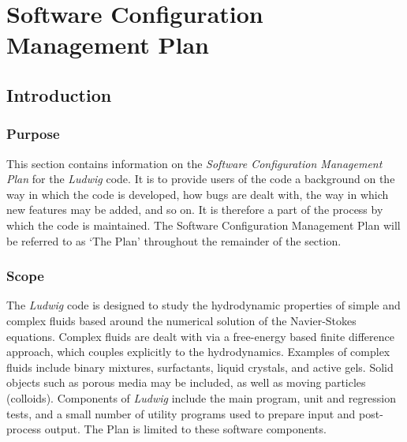 %
%
%
%
%
%


\section{Software Configuration Management Plan}

\subsection{Introduction}

\subsubsection{Purpose}

This section contains information on the \textit{Software Configuration
Management Plan} for the \textit{Ludwig} code.
It is to provide users of the code a background on the way in which
the code is developed, how bugs are dealt with, the way in which
new features may be added, and so on. It is therefore a part
of the process by which the code is maintained. The Software Configuration
Management Plan will be referred to as `The Plan' throughout the remainder
of the section.

\subsubsection{Scope}

The \textit{Ludwig} code is designed to study the hydrodynamic properties
of simple and complex fluids based around the numerical solution of the
Navier-Stokes equations. Complex fluids are dealt with via a free-energy
based finite difference approach, which couples explicitly to the
hydrodynamics. Examples of complex fluids include binary mixtures,
surfactants, liquid crystals, and active gels. Solid objects such as
porous media may be included, as well as moving particles (colloids).
Components of \textit{Ludwig} include the main program, unit and
regression tests, and a small number of utility programs used to prepare
input and post-process output. The Plan is limited to these
software components.

